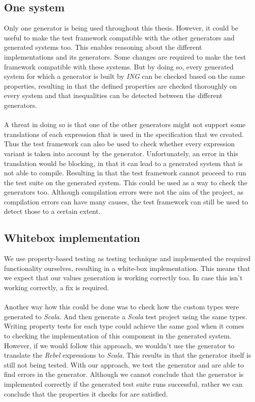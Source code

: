 \subsection*{One system}
Only one generator is being used throughout this thesis. However, it could be
useful to make the test framework compatible with the other generators and
generated systems too. This enables reasoning about the different
implementations and its generators. Some changes are required to make the test
framework compatible with these systems. But by doing so, every generated system
for which a generator is built by \textit{ING} can be checked based on the same
properties, resulting in that the defined properties are checked thoroughly on
every system and that inequalities can be detected between the different
generators.\\
\\
A threat in doing so is that one of the other generators might not support some
translations of each expression that is used in the specification that we
created. Thus the test framework can also be used to check whether every
expression variant is taken into account by the generator. Unfortunately, an
error in this translation would be blocking, in that it can lead to a generated
system that is not able to compile. Resulting in that the test framework cannot
proceed to run the test suite on the generated system. This could be used as a
way to check the generators too. Although compilation errors were not the aim of
the project, as compilation errors can have many causes, the test framework can
still be used to detect those to a certain extent.

\subsection*{Whitebox implementation}
We use property-based testing as testing technique and implemented the required
functionality ourselves, resulting in a white-box implementation. This means
that we expect that our values generation is working correctly too. In case this
isn't working correctly, a fix is required.\\
\\
Another way how this could be done was to check how the custom types were
generated to \textit{Scala}. And then generate a \textit{Scala} test project
using the same types. Writing property tests for each type could achieve the
same goal when it comes to checking the implementation of this component in the
generated system. However, if we would follow this approach, we wouldn't use the
generator to translate the \textit{Rebel} expressions to \textit{Scala}. This
results in that the generator itself is still not being tested. With our
approach, we test the generator and are able to find errors in the generator.
Although we cannot conclude that the generator is implemented correctly if the
generated test suite runs successful, rather we can conclude that the properties
it checks for are satisfied.
